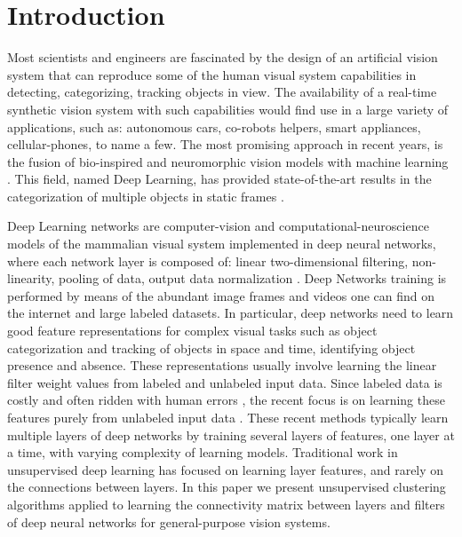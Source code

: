\documentclass{article} %
\begin{document}
\section{Introduction}

Most scientists and engineers are fascinated by the design of an artificial vision system that can reproduce some of the human visual system capabilities in detecting, categorizing, tracking objects in view. The availability of a real-time synthetic vision system with such capabilities would find use in a large variety of applications, such as: autonomous cars, co-robots helpers, smart appliances, cellular-phones, to name a few. The most promising approach in recent years, is the fusion of bio-inspired and neuromorphic vision models with machine learning \cite{lecun_gradient-based_1998,hadsell_dimensionality_2006,gregor_structured_2011,riesenhuber_hierarchical_1999,serre_feedforward_2007,serre_neuromorphic_2010,jarrett_what_2009,lecun_convolutional_2010,boureau_theoretical_2010}. This field, named Deep Learning, has provided state-of-the-art results in the categorization of multiple objects in static frames \cite{krizhevsky_imagenet_2012}.

Deep Learning networks are computer-vision and computational-neuroscience models of the mammalian visual system implemented in deep neural networks, where each network layer is composed of: linear two-dimensional filtering, non-linearity, pooling of data, output data normalization \cite{jarrett_what_2009,lecun_convolutional_2010,boureau_theoretical_2010}. 
Deep Networks training is performed by means of the abundant image frames and videos one can find on the internet and large labeled datasets. In particular, deep networks need to learn good feature representations for complex visual tasks such as object categorization and tracking of objects in space and time, identifying object presence and absence. These representations usually involve learning the linear filter weight values from labeled and unlabeled input data. Since labeled data is costly and often ridden with human errors \cite{karpathy_lessons_2011, torralba_unbiased_2011, hou_meta-theory_2012}, the recent focus is on learning these features purely from unlabeled input data \cite{olshausen_emergence_1996, hyvarinen_independent_2000, hinton_fast_2006, vincent_extracting_2008, coates_analysis_2011}. These recent methods typically learn multiple layers of deep networks by training several layers of features, one layer at a time, with varying complexity of learning models. Traditional work in unsupervised deep learning has focused on learning layer features, and rarely on the connections between layers. In this paper we present unsupervised clustering algorithms applied to learning the connectivity matrix between layers and filters of deep neural networks for general-purpose vision systems. 
\end{document}
